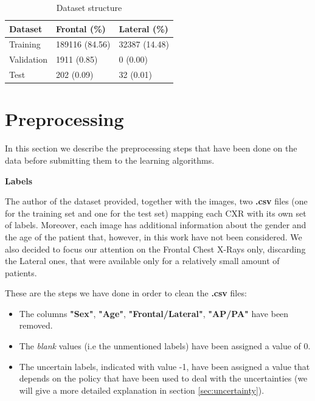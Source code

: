 \vspace{5mm}

\begin{table}[h!]
\centering
\begin{tabular}{|l|l|l|} 
\hline
\textbf{Dataset}         &   \hfill \textbf{Frontal (\%)} &   \hfill \textbf{Lateral (\%)} \\
\hline
Training &    \hfill 189116 (84.56)   & \hfill 32387 (14.48) \\\hline
Validation &    \hfill 1911 (0.85)   & \hfill 0 (0.00)\\\hline
Test &    \hfill 202 (0.09) & \hfill 32 (0.01) \\

\hline
\end{tabular}
\caption{Dataset structure}
\label{table:table_3}
\end{table}


\section{Preprocessing}
\label{sec:preprocessing}
In this section we describe the preprocessing steps that have been done on the data before submitting them to the learning algorithms.

\vspace{5mm}

\noindent\textbf{Labels}

\vspace{5mm}

\noindent The author of the dataset provided, together with the images, two \textbf{.csv} files (one for the training set and one for the test set) mapping each \ac{CXR} with its own set of labels. Moreover, each image has additional information about the gender and the age of the patient that, however, in this work have not been considered. We also decided to focus our attention on the Frontal Chest X-Rays only, discarding the Lateral ones, that were available only for a relatively small amount of patients.

\noindent These are the steps we have done in order to clean the \textbf{.csv} files: 
\begin{itemize}
    \item The columns \textbf{"Sex"}, \textbf{"Age"}, \textbf{"Frontal/Lateral"}, \textbf{"AP/PA"} have been removed.
    \item The \textit{blank} values (i.e the unmentioned labels) have been assigned a value of 0.
    \item The uncertain labels, indicated with value -1, have been assigned a value that depends on the policy that have been used to deal with the uncertainties (we will give a more detailed explanation in section \ref{sec:uncertainty}).
\end{itemize}

